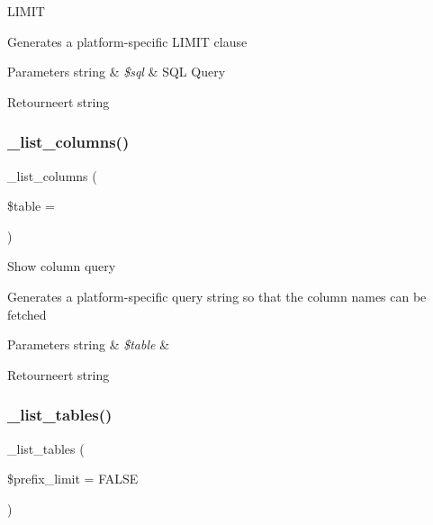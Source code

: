 L\+I\+M\+IT

Generates a platform-\/specific L\+I\+M\+IT clause


\begin{DoxyParams}[1]{Parameters}
string & {\em \$sql} & S\+QL Query \\
\hline
\end{DoxyParams}
\begin{DoxyReturn}{Retourneert}
string 
\end{DoxyReturn}
\mbox{\label{class_c_i___d_b__oci8__driver_a7ccb7f9c301fe7f0a9db701254142b63}} 
\subsubsection{\texorpdfstring{\_list\_columns()}{\_list\_columns()}}
{\footnotesize\ttfamily \+\_\+list\+\_\+columns (\begin{DoxyParamCaption}\item[{}]{\$table = {\ttfamily \textquotesingle{}\textquotesingle{}} }\end{DoxyParamCaption})\hspace{0.3cm}{\ttfamily [protected]}}

Show column query

Generates a platform-\/specific query string so that the column names can be fetched


\begin{DoxyParams}[1]{Parameters}
string & {\em \$table} & \\
\hline
\end{DoxyParams}
\begin{DoxyReturn}{Retourneert}
string 
\end{DoxyReturn}
\mbox{\label{class_c_i___d_b__oci8__driver_a435c0f3ce54fe7daa178baa8532ebd54}} 
\subsubsection{\texorpdfstring{\_list\_tables()}{\_list\_tables()}}
{\footnotesize\ttfamily \+\_\+list\+\_\+tables (\begin{DoxyParamCaption}\item[{}]{\$prefix\+\_\+limit = {\ttfamily FALSE} }\end{DoxyParamCaption})\hspace{0.3cm}{\ttfamily [protected]}}

